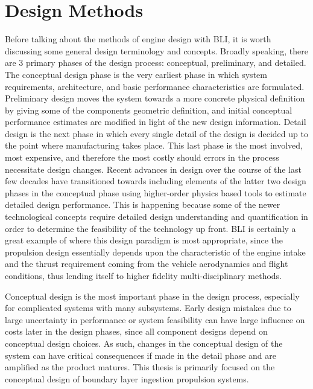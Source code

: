 \section{Design Methods}
Before talking about the methods of engine design with BLI, it is worth discussing some general design terminology and concepts. Broadly speaking, there are 3 primary phases of the design process: conceptual, preliminary, and detailed. The conceptual design phase is the very earliest phase in which system requirements, architecture, and basic performance characteristics are formulated. Preliminary design moves the system towards a more concrete physical definition by giving some of the components geometric definition, and initial conceptual performance estimates are modified in light of the new design information. Detail design is the next phase in which every single detail of the design is decided up to the point where manufacturing takes place. This last phase is the most involved, most expensive, and therefore the most costly should errors in the process necessitate design changes. Recent advances in design over the course of the last few decades have transitioned towards including elements of the latter two design phases in the conceptual phase using higher-order physics based tools to estimate detailed design performance. This is happening because some of the newer technological concepts require detailed design understanding and quantification in order to determine the feasibility of the technology up front.  BLI is certainly a great example of where this design paradigm is most appropriate, since the propulsion design essentially depends upon the characteristic of the engine intake and the thrust requirement coming from the vehicle aerodynamics and flight conditions, thus lending itself to higher fidelity multi-disciplinary methods. 

Conceptual design is the most important phase in the design process, especially for complicated systems with many subsystems.  Early design mistakes due to large uncertainty in performance or system feasibility can have large influence on costs later in the design phases, since all component designs depend on conceptual design choices. As such, changes in the conceptual  design of the system can have critical consequences if made in the detail phase and are amplified as the product matures.  This thesis is primarily focused on the conceptual design of boundary layer ingestion propulsion systems.  

